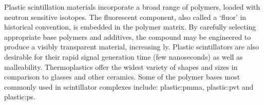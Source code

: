 \documentclass[../../../../main.tex]{subfiles}%
\begin{document}
%
    \Xsubsubsection%
    Plastic scintillation materials incorporate a broad range of polymers, loaded with neutron sensitive isotopes.
    The fluorescent component, also called a `fluor' in historical convention, is embedded in the polymer matrix.
    By carefully selecting appropriate base polymers and additives, the compound may be engineered to produce a visibly transparent material, increasing \gls{ly}.
    Plastic scintillators are also desirable for their rapid signal generation time (few nanoseconds) as well as malleability.
    Thermoplastics offer the widest variety of shapes and sizes in comparison to glasses and other ceramics.
    Some of the polymer bases most commonly used in scintillator complexes include: \gls{plastic:pmma}, \gls{plastic:pvt} and \gls{plastic:ps}.
\end{document}
